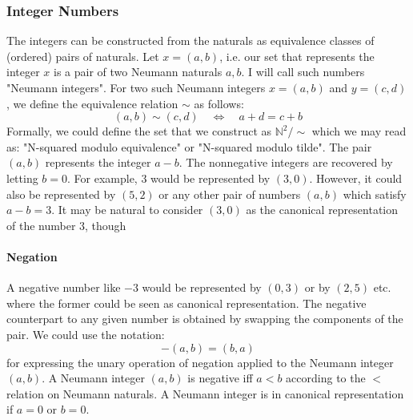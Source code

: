 




\subsubsection{Integer Numbers} The integers can be constructed from the naturals as equivalence classes of (ordered) pairs of naturals. Let $x = (a,b)$, i.e. our set that represents the integer $x$ is a pair of two Neumann naturals $a,b$. I will call such numbers "Neumann integers". For two such Neumann integers $x = (a,b)$ and $y = (c,d)$, we define the equivalence relation $\sim$ as follows:
\begin{equation}
(a,b) \sim (c,d) \quad \Leftrightarrow  \quad a+d = c+b
\end{equation}
Formally, we could define the set that we construct as $\mathbb{N}^2 / \sim$ which we may read as: "N-squared modulo equivalence" or "N-squared modulo tilde". The pair $(a,b)$ represents the integer $a-b$. The nonnegative integers are recovered by letting $b = 0$. For example, $3$ would be represented by $(3,0)$. However, it could also be represented by $(5,2)$ or any other pair of numbers $(a,b)$ which satisfy $a-b = 3$. It may be natural to consider $(3,0)$ as the canonical representation of the number $3$, though

\paragraph{Negation}
A negative number like $-3$ would be represented by $(0,3)$ or by $(2,5)$ etc. where the former could be seen as canonical representation. The negative counterpart to any given number is obtained by swapping the components of the pair. We could use the notation:
\begin{equation}
 -(a,b) = (b,a)
\end{equation}
for expressing the unary operation of negation applied to the Neumann integer $(a,b)$. A Neumann integer $(a,b)$ is negative iff $a < b$ according to the $<$ relation on Neumann naturals. A Neumann integer is in canonical representation if $a = 0$ or $b = 0$.

